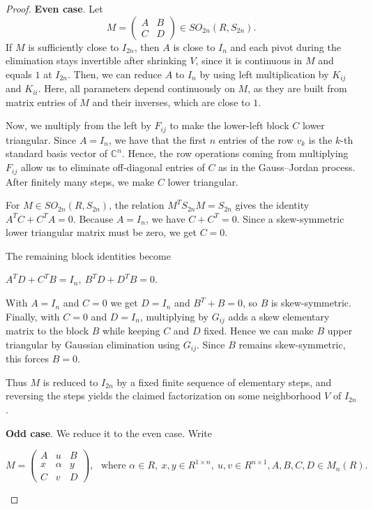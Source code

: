\documentclass[11pt]{amsart}
\theoremstyle{definition}
\theoremstyle{remark}
\theoremstyle{remark}
\begin{document}
\begin{proof}
\textbf{Even case}.
Let 
$$
    M=\begin{pmatrix}A&B\\ C&D\end{pmatrix} \in SO_{2n}(R,S_{2n}).
$$
If $M$ is sufficiently close to $I_{2n}$, then $A$  is close to $I_n$ and each pivot during the elimination stays invertible after shrinking $V$, since it is continuous in $M$ and equals $1$ at $I_{2n}$.
Then, we can reduce $A$ to $I_n$ by using left multiplication by $K_{ij}$ and $K_{ii}$.
Here, all parameters depend continuously on $M$, as they are built from matrix entries of $M$ and their inverses, which are close to $1$.

Now, we multiply from the left by $F_{ij}$ to make the lower-left block $C$ lower triangular.
Since $A=I_n$, we have that the first $n$ entries of the row $v_k$ is the $k$-th standard basis vector of $\mathbb{C}^n$.
Hence, the row operations coming from multiplying $F_{ij}$ allow us to eliminate off-diagonal entries of $C$
as in the Gauss--Jordan process. After finitely many steps, we make $C$ lower triangular.

For $M\in SO_{2n}(R,S_{2n})$, the relation $M^TS_{2n}M=S_{2n}$ gives the identity $A^T C + C^T A = 0$.
Because $A=I_n$, we have $C+C^T=0$. Since a skew-symmetric lower triangular matrix
must be zero, we get $C = 0$. 

The remaining block identities become
\begin{center}
$A^T D + C^T B = I_n,\ B^T D + D^T B = 0.$
\end{center}
With $A=I_n$ and $C=0$ we get $D=I_n$ and $B^T+B=0$, so $B$ is skew-symmetric.
Finally, with $C=0$ and $D=I_n$, multiplying by $G_{ij}$ adds a skew elementary matrix to the block $B$
while keeping $C$ and $D$ fixed. Hence we can make $B$ upper triangular by Gaussian elimination using
$G_{ij}$. Since $B$ remains skew-symmetric, this forces $B=0$.

Thus $M$ is reduced to $I_{2n}$ by a fixed finite sequence of elementary steps, and reversing the steps yields the
claimed factorization on some neighborhood $V$ of $I_{2n}$. 

\textbf{Odd case}. 
We reduce it to the even case. Write
\begin{center}
$M=
\begin{pmatrix}
A&u&B\\
x&\alpha&y\\
C&v&D
\end{pmatrix}, 
    \,\, \text{ where } \alpha\in R,\
    x,y\in R^{1\times n},\
    u,v\in R^{n\times 1},
    A,B,C,D\in M_n(R).$
\end{center}


\end{proof}
\end{document}
